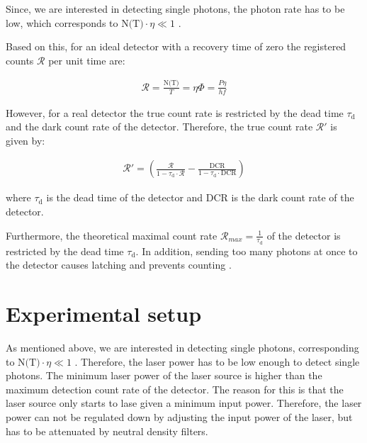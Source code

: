 Since, we are interested in detecting single photons, the photon rate has to be low, which corresponds to
$\text{N(T)} \cdot \eta \ll 1$ \cite{hadfield-2009}.

Based on this, for an ideal detector with a recovery time of zero the registered counts $\mathcal{R}$ per unit time are:

\begin{align}
    \mathcal{R} = \frac{\text{N(T)}}{T} = \eta \Phi= \frac{P \eta}{h f}
\end{align}

However, for a real detector the true count rate is restricted by the dead time $\tau_{\text{d}}$ and
the dark count rate of the detector.
Therefore, the true count rate $\mathcal{R}'$ is given by:


\begin{align}\label{eq:true_count_rate}
    \mathcal{R}' = \left(\frac{\mathcal{R}}{1 - \tau_{\text{d}} \cdot \mathcal{R}}
    - \frac{\text{DCR}}{1 - \tau_{\text{d}} \cdot \text{DCR}}\right)
\end{align}

where $\tau_{\text{d}}$ is the dead time of the detector and DCR is the dark count rate of the detector.

Furthermore, the theoretical maximal count rate $\mathcal{R}_{max} = \frac{1}{\tau_{\text{d}}}$ of the detector is restricted by the dead time $\tau_{\text{d}}$.
In addition, sending too many photons at once to the detector causes latching and prevents counting \cite{single-quantum-2022}.

\section{Experimental setup}\label{sec:experimental_setup}
As mentioned above, we are interested in detecting single photons, corresponding to $\text{N(T)} \cdot \eta \ll 1$ \cite{hadfield-2009}.
Therefore, the laser power has to be low enough to detect single photons.
The minimum laser power of the laser source is higher than the maximum detection count rate of the detector.
The reason for this is that the laser source only starts to lase given a minimum input power.
Therefore, the laser power can not be regulated down by adjusting the input power of the laser, but has to be attenuated
by neutral density filters.\\

